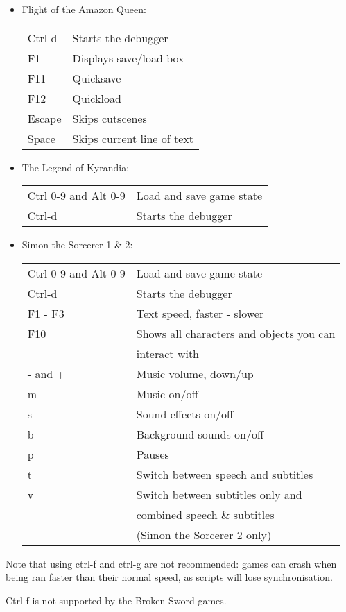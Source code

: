 \begin{itemize}
\begin{tabular}{ll}
  \end{tabular}
\item Flight of the Amazon Queen:
  \begin{tabular}{ll}
    Ctrl-d                 & Starts the debugger\\
    F1                     & Displays save/load box\\
    F11                    & Quicksave\\
    F12                    & Quickload\\
    Escape                 & Skips cutscenes\\
    Space                  & Skips current line of text\\
  \end{tabular}
\item The Legend of Kyrandia:\\
  \begin{tabular}{ll}
    Ctrl 0-9 and Alt 0-9   & Load and save game state\\
    Ctrl-d                 & Starts the debugger\\
  \end{tabular}
\item Simon the Sorcerer 1 \& 2:\\
  \begin{tabular}{ll}
    Ctrl 0-9 and Alt 0-9   & Load and save game state\\
    Ctrl-d                 & Starts the debugger\\
    F1 - F3                & Text speed, faster - slower\\
    F10                    & Shows all characters and objects you can \\
                           & interact with\\
    - and +                & Music volume, down/up\\
    m                      & Music on/off\\
    s                      & Sound effects on/off\\
    b                      & Background sounds on/off\\
    p                      & Pauses\\
    t                      & Switch between speech and subtitles\\
    v                      & Switch between subtitles only and\\
                           & combined speech \& subtitles\\
                           & (Simon the Sorcerer 2 only)\\
  \end{tabular}
\end{itemize}
Note that using ctrl-f and ctrl-g are not recommended: games can crash when
being ran faster than their normal speed, as scripts will lose synchronisation.

Ctrl-f is not supported by the Broken Sword games.
